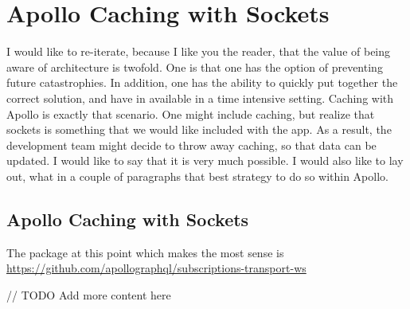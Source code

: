 \maketitle{}
\section{ Apollo Caching with Sockets }

I would like to re-iterate, because I like you the reader, that the value of
being aware of architecture is twofold. One is that one has the option of
preventing future catastrophies. In addition, one has the ability to quickly
put together the correct solution, and have in available in a time intensive
setting. Caching with Apollo is exactly that scenario. One might include
caching, but realize that sockets is something that we would like included with
the app. As a result, the development team might decide to throw away caching,
so that data can be updated. I would like to say that it is very much possible.
I would also like to lay out, what in a couple of paragraphs that best strategy
to do so within Apollo.

\subsection{ Apollo Caching with Sockets }

The package at this point which makes the most sense is
\href{subscriptions-transport-ws}{https://github.com/apollographql/subscriptions-transport-ws}

// TODO Add more content here
